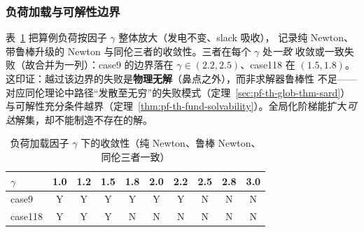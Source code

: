 \subsubsection{负荷加载与可解性边界}
表~\ref{tab:pf-th-glob-stress} 把算例负荷按因子 $\gamma$ 整体放大（发电不变、slack 吸收），
记录纯 Newton、带鲁棒升级的 Newton 与同伦三者的收敛性。三者在每个 $\gamma$ 处\emph{一致}
收敛或一致失败（故合并为一列）：case9 的边界落在 $\gamma\in(2.2,2.5)$、case118 在
$(1.5,1.8)$。这印证：越过该边界的失败是\textbf{物理无解}（鼻点之外），而非求解器鲁棒性
不足——对应同伦理论中路径“发散至无穷”的失败模式（定理~\ref{sec:pf-th-glob-thm-sard}）
与可解性充分条件越界（定理~\ref{thm:pf-th-fund-solvability}）。全局化阶梯能扩大\emph{可
达}解集，却不能制造不存在的解。
\begin{table}[H]\centering\footnotesize
\caption{负荷加载因子 $\gamma$ 下的收敛性（纯 Newton、鲁棒 Newton、同伦三者一致）}
\label{tab:pf-th-glob-stress}
\begin{tabular}{@{}lccccccccc@{}}
\toprule
$\gamma$ & 1.0 & 1.2 & 1.5 & 1.8 & 2.0 & 2.2 & 2.5 & 2.8 & 3.0\\
\midrule
case9   & Y & Y & Y & Y & Y & Y & N & N & N\\
case118 & Y & Y & Y & N & N & N & N & N & N\\
\bottomrule
\end{tabular}
\end{table}

